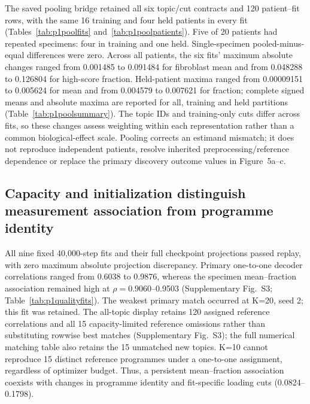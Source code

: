 \documentclass[10pt,a4paper]{article}
\begin{document}
The saved pooling bridge retained all six topic/cut contracts and 120 patient--fit rows, with the same 16 training and four held patients in every fit (Tables~\ref{tab:p1poolfits} and~\ref{tab:p1poolpatients}). Five of 20 patients had repeated specimens: four in training and one held. Single-specimen pooled-minus-equal differences were zero. Across all patients, the six fits' maximum absolute changes ranged from 0.001485 to 0.091484 for fibroblast mean and from 0.048288 to 0.126804 for high-score fraction. Held-patient maxima ranged from 0.00009151 to 0.005624 for mean and from 0.004579 to 0.007621 for fraction; complete signed means and absolute maxima are reported for all, training and held partitions (Table~\ref{tab:p1poolsummary}). The topic IDs and training-only cuts differ across fits, so these changes assess weighting within each representation rather than a common biological-effect scale. Pooling corrects an estimand mismatch; it does not reproduce independent patients, resolve inherited preprocessing/reference dependence or replace the primary discovery outcome values in Figure~5a--c.

\subsection{Capacity and initialization distinguish measurement association from programme identity}

All nine fixed 40,000-step fits and their full checkpoint projections passed replay, with zero maximum absolute projection discrepancy. Primary one-to-one decoder correlations ranged from 0.6038 to 0.9876, whereas the specimen mean--fraction association remained high at $\rho=0.9060$--0.9503 (Supplementary Fig.~S3\label{call:p1f10}; Table~\ref{tab:p1qualityfits}). The weakest primary match occurred at K=20, seed 2; this fit was retained. The all-topic display retains 120 assigned reference correlations and all 15 capacity-limited reference omissions rather than substituting rowwise best matches (Supplementary Fig.~S3); the full numerical matching table also retains the 15 unmatched new topics. K=10 cannot reproduce 15 distinct reference programmes under a one-to-one assignment, regardless of optimizer budget. Thus, a persistent mean--fraction association coexists with changes in programme identity and fit-specific loading cuts (0.0824--0.1798).
\end{document}
